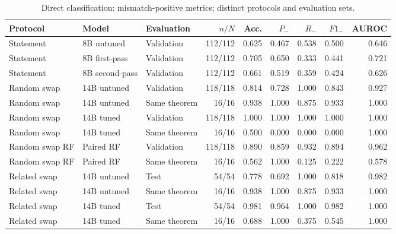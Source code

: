 \begin{table}[htbp]
\centering
\caption{Direct classification: mismatch-positive metrics; distinct protocols and evaluation sets.}
\label{tab:compact-results}
\small
\begin{adjustbox}{max width=\textwidth}
\begin{tabular}{lllrrrrrr}
\toprule
Protocol & Model & Evaluation & $n/N$ & Acc. & $P_-$ & $R_-$ & $F1_-$ & AUROC \\
\midrule
Statement & 8B untuned & Validation & 112/112 & 0.625 & 0.467 & 0.538 & 0.500 & 0.646 \\
Statement & 8B first-pass & Validation & 112/112 & 0.705 & 0.650 & 0.333 & 0.441 & 0.721 \\
Statement & 8B second-pass & Validation & 112/112 & 0.661 & 0.519 & 0.359 & 0.424 & 0.626 \\
Random swap & 14B untuned & Validation & 118/118 & 0.814 & 0.728 & 1.000 & 0.843 & 0.927 \\
Random swap & 14B untuned & Same theorem & 16/16 & 0.938 & 1.000 & 0.875 & 0.933 & 1.000 \\
Random swap & 14B tuned & Validation & 118/118 & 1.000 & 1.000 & 1.000 & 1.000 & 1.000 \\
Random swap & 14B tuned & Same theorem & 16/16 & 0.500 & 0.000 & 0.000 & 0.000 & 1.000 \\
Random swap RF & Paired RF & Validation & 118/118 & 0.890 & 0.859 & 0.932 & 0.894 & 0.962 \\
Random swap RF & Paired RF & Same theorem & 16/16 & 0.562 & 1.000 & 0.125 & 0.222 & 0.578 \\
Related swap & 14B untuned & Test & 54/54 & 0.778 & 0.692 & 1.000 & 0.818 & 0.982 \\
Related swap & 14B untuned & Same theorem & 16/16 & 0.938 & 1.000 & 0.875 & 0.933 & 1.000 \\
Related swap & 14B tuned & Test & 54/54 & 0.981 & 0.964 & 1.000 & 0.982 & 1.000 \\
Related swap & 14B tuned & Same theorem & 16/16 & 0.688 & 1.000 & 0.375 & 0.545 & 1.000 \\
\bottomrule
\end{tabular}
\end{adjustbox}
\end{table}
